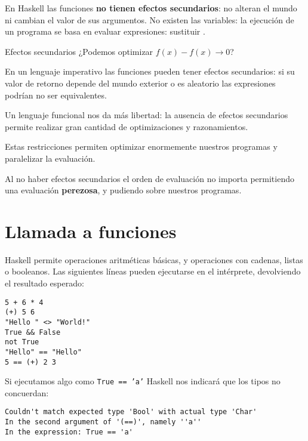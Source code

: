 En Haskell las funciones \textbf{no tienen efectos secundarios}: no alteran el
mundo ni cambian el valor de sus argumentos. No existen las variables: la
ejecución de un programa se basa en evaluar expresiones: sustituir
.

\begin{otro}{Efectos secundarios}
  ¿Podemos optimizar $ f(x) - f(x) \rightarrow 0$?

  \espacio

  En un lenguaje imperativo las funciones pueden tener efectos secundarios:
  si su valor de retorno depende del mundo exterior o es aleatorio las expresiones
  podrían no ser equivalentes.

  \espacio

  Un lenguaje funcional nos da más libertad: la ausencia de efectos secundarios
  permite realizar gran cantidad de optimizaciones y razonamientos.
\end{otro}

Estas restricciones permiten optimizar enormemente nuestros programas y paralelizar
la evaluación.

Al no haber efectos secundarios el orden de evaluación no importa permitiendo una
evaluación \textbf{perezosa}, y pudiendo
 sobre nuestros programas.


\section{Llamada a funciones}

Haskell permite operaciones aritméticas básicas, y operaciones con
cadenas, listas o booleanos. Las siguientes líneas pueden ejecutarse en el
intérprete, devolviendo el resultado esperado:

\begin{lstlisting}
5 + 6 * 4
(+) 5 6
"Hello " <> "World!"
True && False
not True
"Hello" == "Hello"
5 == (+) 2 3
\end{lstlisting}

Si ejecutamos algo como \texttt{True == 'a'} Haskell nos indicará que los tipos
no concuerdan:

\begin{lstlisting}
Couldn't match expected type 'Bool' with actual type 'Char'
In the second argument of '(==)', namely ''a''
In the expression: True == 'a'
\end{lstlisting}

